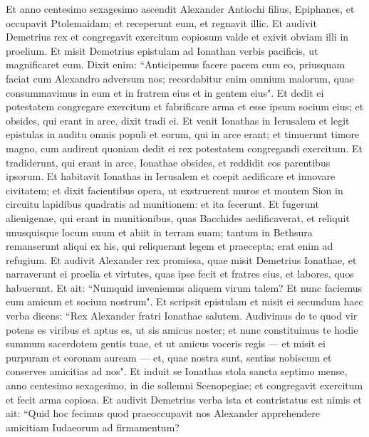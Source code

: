 \begin{biblechapter}  
\verse Et anno centesimo sexagesimo ascendit Alexander Antiochi filius, Epiphanes, et occupavit Ptolemaidam; et receperunt eum, et regnavit illic. 
\verse Et audivit Demetrius rex et congregavit exercitum copiosum valde et exivit obviam illi in proelium. 
\verse Et misit Demetrius epistulam ad Ionathan verbis pacificis, ut magnificaret eum. 
\verse Dixit enim: “Anticipemus facere pacem cum eo, priusquam faciat cum Alexandro adversum nos; 
\verse recordabitur enim omnium malorum, quae consummavimus in eum et in fratrem eius et in gentem eius". 
\verse Et dedit ei potestatem congregare exercitum et fabrificare arma et esse ipsum socium eius; et obsides, qui erant in arce, dixit tradi ei. 
\verse Et venit Ionathas in Ierusalem et legit epistulas in auditu omnis populi et eorum, qui in arce erant; 
\verse et timuerunt timore magno, cum audirent quoniam dedit ei rex potestatem congregandi exercitum. 
\verse Et tradiderunt, qui erant in arce, Ionathae obsides, et reddidit eos parentibus ipsorum. 
\verse Et habitavit Ionathas in Ierusalem et coepit aedificare et innovare civitatem; 
\verse et dixit facientibus opera, ut exstruerent muros et montem Sion in circuitu lapidibus quadratis ad munitionem: et ita fecerunt. 
\verse Et fugerunt alienigenae, qui erant in munitionibus, quas Bacchides aedificaverat, 
\verse et reliquit unusquisque locum suum et abiit in terram suam; 
\verse tantum in Bethsura remanserunt aliqui ex his, qui reliquerant legem et praecepta; erat enim ad refugium. 
\verse Et audivit Alexander rex promissa, quae misit Demetrius Ionathae, et narraverunt ei proelia et virtutes, quas ipse fecit et fratres eius, et labores, quos habuerunt. 
\verse Et ait: “Numquid inveniemus aliquem virum talem? Et nunc faciemus eum amicum et socium nostrum". 
\verse Et scripsit epistulam et misit ei secundum haec verba dicens: 
\verse “Rex Alexander fratri Ionathae salutem.  
\verse Audivimus de te quod vir potens es viribus et aptus es, ut sis amicus noster;  
\verse et nunc constituimus te hodie summum sacerdotem gentis tuae, et ut amicus voceris regis — et misit ei purpuram et coronam auream — et, quae nostra sunt, sentias nobiscum et conserves amicitias ad nos". 
\verse Et induit se Ionathas stola sancta septimo mense, anno centesimo sexagesimo, in die sollemni Scenopegiae; et congregavit exercitum et fecit arma copiosa. 
\verse Et audivit Demetrius verba ista et contristatus est nimis et ait: 
\verse “Quid hoc fecimus quod praeoccupavit nos Alexander apprehendere amicitiam Iudaeorum ad firmamentum? 

\end{biblechapter}
